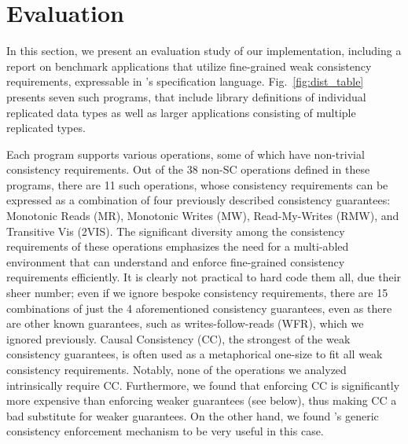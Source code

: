 \section{Evaluation}
\label{sec:eval}
%
In this section, we present an evaluation study of our implementation,
including a report on
benchmark applications that utilize fine-grained weak consistency
requirements, expressable
in \tool's specification language.
Fig.~\ref{fig:dist_table} presents seven such programs, that include
library definitions of individual replicated data types as well as
larger applications consisting of multiple replicated types. 

Each program supports various operations, some of which have
non-trivial consistency requirements. Out of the 38 non-SC operations
defined in these programs, there are 11 such operations, whose
consistency requirements can be expressed as a combination of four
previously described consistency guarantees: Monotonic Reads (MR),
Monotonic Writes (MW), Read-My-Writes (RMW), and Transitive Vis
(2VIS). The significant diversity among the consistency requirements
of these operations emphasizes the need for a multi-abled environment
that can understand and enforce fine-grained consistency requirements
efficiently. It is clearly not practical to hard code them all, due
their sheer number; even if we ignore bespoke consistency
requirements, there are 15 combinations of just the 4 aforementioned
consistency guarantees, even as there are other known guarantees, such
as writes-follow-reads (WFR), which we ignored previously.  Causal Consistency
(CC), the strongest of the weak consistency guarantees, is often used
as a metaphorical one-size to fit all weak consistency requirements.
Notably, none of the operations we analyzed intrinsically require CC.
Furthermore, we found that enforcing CC is significantly more
expensive than enforcing weaker guarantees (see below), thus making CC
a bad substitute for weaker guarantees. On the other hand, we found
\tool's generic consistency enforcement mechanism to be very useful in
this case.

